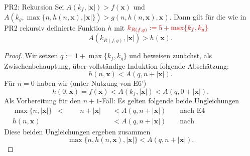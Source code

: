 \documentclass[a4paper]{amsart}
\theoremstyle{definition}
\newcommand{\bb}[1]{\mathbf{#1}}
\begin{document}
\begin{Theorem}{PR2: Rekursion}
    Sei $A( k_f, |\bb{x}| ) > f( \bb{x} )$ und 
    $A( k_g, \max \{ n, h( n,\bb{x} ), |\bb{x}|\} ) > g( n, h( n,\bb{x} ), \bb{x} )$. 
    Dann gilt für die wie in PR2 rekursiv definierte
    Funktion $h$ mit $\color{red}{k_{R(f,g)} := 5 + \max \{ k_f, k_g \}}$
    \begin{equation*}
        A( k_{R(f,g)}, |\bb{x}| ) > h( \bb{x}).
    \end{equation*}
\end{Theorem}
\begin{proof}
    Wir setzen $q := 1 + \max \{ k_f, k_g \}$ und beweisen zunächst, als Zwischenbehauptung, über vollständige Induktion
    folgende Abschätzung:
    \begin{equation}\label{zwischen}
        \boxed{h( n, \bb{x}) < A( q, n+ |\bb{x}| )}.
    \end{equation}
    Für $n=0$ haben wir (unter Nutzung von E6')
    \begin{equation*}
        h( 0, \bb{x}) = f( \bb{x} ) < A( k_f, |\bb{x}| ) < A( q, 0+|\bb{x}| ).
    \end{equation*}
    Als Vorbereitung für den $n+1$-Fall: Es gelten folgende beide Ungleichungen
    \begin{align*}
        &\max \{ n, |\bb{x}|\} & < &&& n + |\bb{x}|  &&< A(q, n + |\bb{x}|) &&\text{ nach E4 }\\
        &h( n,\bb{x} )         &   &&&               &&< A(q, n + |\bb{x}|) &&\text{ nach Induktionsvoraussetzung }
    \end{align*}
    Diese beiden Ungleichungen ergeben zusammen
    \begin{equation}\label{max}
        \boxed{\max \{ n, h( n,\bb{x} ), |\bb{x}|\} < A(q, n + |\bb{x}|)}.
    \end{equation}


\end{proof}
\end{document}

